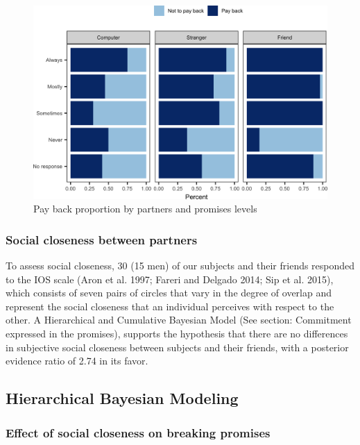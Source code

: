 \documentclass[smallextended]{svjour3}       %
\begin{document}
\begin{figure}

{\centering \includegraphics[width=0.8\linewidth]{behavioral-promises_files/figure-latex/fig2-1} 

}

\caption{Pay back proportion by partners and promises levels}\label{fig:fig2}
\end{figure}

\hypertarget{social-closeness-between-partners}{%
\subsubsection{Social closeness between
partners}\label{social-closeness-between-partners}}

To assess social closeness, 30 (15 men) of our subjects and their
friends responded to the IOS scale (Aron et al. 1997; Fareri and Delgado
2014; Sip et al. 2015), which consists of seven pairs of circles that
vary in the degree of overlap and represent the social closeness that an
individual perceives with respect to the other. A Hierarchical and
Cumulative Bayesian Model (See section: Commitment expressed in the
promises), supports the hypothesis that there are no differences in
subjective social closeness between subjects and their friends, with a
posterior evidence ratio of 2.74 in its favor.

\hypertarget{hierarchical-bayesian-modeling}{%
\subsection{Hierarchical Bayesian
Modeling}\label{hierarchical-bayesian-modeling}}

\hypertarget{effect-of-social-closeness-on-breaking-promises}{%
\subsubsection{Effect of social closeness on breaking
promises}\label{effect-of-social-closeness-on-breaking-promises}}
\end{document}
